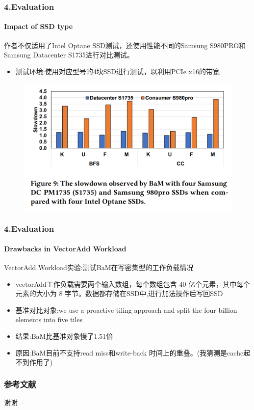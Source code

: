 \documentclass[10pt]{ctexbeamer}
\begin{document}
\begin{frame}
  \frametitle{4.Evaluation}
  \framesubtitle{Impact of SSD type}
  作者不仅适用了Intel Optane SSD测试，还使用性能不同的Samsung S980PRO和Samsung Datacenter S1735进行对比测试。
  \begin{itemize}
    \item 测试环境:使用对应型号的4块SSD进行测试，以利用PCIe x16的带宽
  \end{itemize}
  \begin{figure}
    \includegraphics[width=.5\textwidth,height=.5\textheight]{images/ssd-type.png}
  \end{figure}

\end{frame}
\begin{frame}
  \frametitle{4.Evaluation}
  \framesubtitle{Drawbacks in VectorAdd Workload}
  VectorAdd Workload实验:测试BaM在写密集型的工作负载情况\
  \begin{itemize}
    \item vectorAdd工作负载需要两个输入数组，每个数组包含 40 亿个元素，其中每个元素的大小为 8 字节。数据都存储在SSD中,进行加法操作后写回SSD
    \item 基准对比对象:we use a proactive tiling approach and split the four billion elements into five tiles
  \end{itemize}
  \begin{itemize}
    \item 结果:BaM比基准对象慢了1.51倍
    \item 原因:BaM目前不支持read miss和write-back 时间上的重叠。(我猜测是cache起不到作用了)
  \end{itemize}
\end{frame}
\begin{frame}
  \frametitle{参考文献}
  \nocite{*}%
  \printbibliography%
\end{frame}

\begin{frame}[plain]
  \vfill
  \centerline{\Huge 谢谢}
  \vfill
\end{frame}
\end{document}
